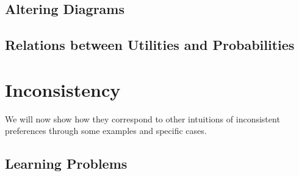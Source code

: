 \documentclass{article}
\begin{document}
	
	





		
	\subsection{Altering Diagrams} \label{sec:diagram-alterations}
	
	\subsection{Relations between Utilities and Probabilities} \label{sec:util-prob-relate}
	

	
	\section{Inconsistency}
	We will now show how they correspond to other intuitions of inconsistent preferences through some examples and specific cases.
	
	




	
	\subsection{Learning Problems}
	
\end{document}

